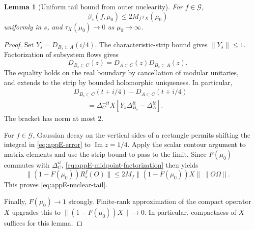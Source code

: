\documentclass[a4paper,11pt]{article}
\newtheorem{lemma}[theorem]{Lemma}
\theoremstyle{definition}
\begin{document}
\begin{lemma}[Uniform tail bound from outer nuclearity]
\label{lem:appE-nuclear-tail}
For $f\in\mathcal G$,
\begin{equation}
 \beta_s(f,\mu_0)\le2M_f\tau_X(\mu_0)
 \label{eq:appE-nuclear-tail}
\end{equation}
uniformly in $s$, and $\tau_X(\mu_0)\to0$ as $\mu_0\to\infty$.
\end{lemma}
\begin{proof}
Set $Y_s=D_{B_s\subset A}(i/4)$. The characteristic-strip bound gives $\|Y_s\|\le1$. Factorization of subsystem flows gives
\[
 D_{B_s\subset C}(z)=D_{A\subset C}(z)D_{B_s\subset A}(z).
\]
The equality holds on the real boundary by cancellation of modular unitaries, and extends to the strip by bounded holomorphic uniqueness. In particular,
\begin{align}
 &D_{B_s\subset C}(t+i/4)-D_{A\subset C}(t+i/4)\nonumber\\
 &\qquad=\Delta_C^{-it}X
 [Y_s\Delta_{B_s}^{it}-\Delta_A^{it}].
 \label{eq:appE-midpoint-factorization}
\end{align}
The bracket has norm at most $2$.

For $f\in\mathcal G$, Gaussian decay on the vertical sides of a rectangle permits shifting the integral in \eqref{eq:appE-error} to $\operatorname{Im}z=1/4$. Apply the scalar contour argument to matrix elements and use the strip bound to pass to the limit. Since $F(\mu_0)$ commutes with $\Delta_C^{it}$, \eqref{eq:appE-midpoint-factorization} then yields
\[
 \|(1-F(\mu_0))R_s^f(O)\|
 \le2M_f\|(1-F(\mu_0))X\|\,\|O\Omega\|.
\]
This proves \eqref{eq:appE-nuclear-tail}.

Finally, $F(\mu_0)\to1$ strongly. Finite-rank approximation of the compact operator $X$ upgrades this to
$\|(1-F(\mu_0))X\|\to0$.
In particular, compactness of $X$ suffices for this lemma.
\end{proof}
\end{document}
